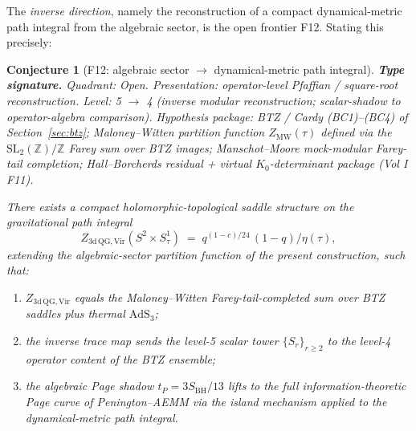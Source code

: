 \documentclass[11pt,reqno]{amsart}
\newtheorem{conjecture}[theorem]{Conjecture}
\theoremstyle{definition}
\theoremstyle{remark}
\begin{document}
The \emph{inverse direction}, namely the reconstruction of a
compact dynamical-metric path integral from the algebraic sector,
is the open frontier F12. Stating this precisely:

\begin{conjecture}[F12: algebraic sector $\to$ dynamical-metric path integral]
\label{conj:f12-frontier}
\textbf{Type signature.} Quadrant: Open.
Presentation: operator-level Pfaffian / square-root reconstruction.
Level: 5 $\to$ 4 (inverse modular reconstruction; scalar-shadow to
operator-algebra comparison).
Hypothesis package: BTZ / Cardy (BC1)--(BC4) of
Section~\ref{sec:btz}; Maloney--Witten partition function
$Z_{\mathrm{MW}}(\tau)$ defined via the
$\mathrm{SL}_2(\mathbb{Z})/\mathbb{Z}$ Farey sum over BTZ images;
Manschot--Moore mock-modular Farey-tail completion; Hall--Borcherds
residual + virtual $K_0$-determinant package (Vol I F11).

There exists a compact holomorphic-topological saddle structure on
the gravitational path integral
\begin{equation}\label{eq:f12-target}
Z_{3\mathrm{d\,QG, Vir}}(S^2 \times S^1_\tau)
\;=\; q^{(1{-}c)/24}\,(1-q)/\eta(\tau),
\end{equation}
extending the algebraic-sector partition function of the present
construction, such that:
\begin{enumerate}[label=\textup{(\roman*)}]
\item $Z_{3\mathrm{d\,QG, Vir}}$ equals the Maloney--Witten
  Farey-tail-completed sum over BTZ saddles plus thermal
  $\mathrm{AdS}_3$;
\item the inverse trace map sends the level-5 scalar tower
  $\{S_r\}_{r \ge 2}$ to the level-4
  operator content of the BTZ ensemble;
\item the algebraic Page shadow $t_P = 3 S_{\mathrm{BH}}/13$ lifts
  to the full information-theoretic Page curve of
  Penington--AEMM via the island mechanism applied to the
  dynamical-metric path integral.
\end{enumerate}
\end{conjecture}
\end{document}
